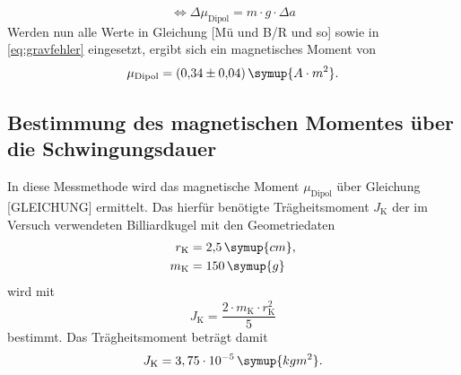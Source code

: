 \begin{equation}
\iff \Delta{\mu_{\text{Dipol}}} = m \cdot g \cdot \Delta a
\label{eq:gravfehler}
\end{equation}
Werden nun alle Werte in Gleichung [Mü und B/R und so] sowie in \eqref{eq:gravfehler} eingesetzt, ergibt sich ein magnetisches
Moment von
\begin{equation*}
\mu_{\text{Dipol}} = (0{,}34 \pm 0{,}04)\, \symup{A \cdot m^2}.
\end{equation*}



\subsection{Bestimmung des magnetischen Momentes über die Schwingungsdauer}
In diese Messmethode wird das magnetische Moment $\mu_{\text{Dipol}}$ über Gleichung [GLEICHUNG] ermittelt. 
Das hierfür benötigte Trägheitsmoment $J_{\text{K}}$ der im Versuch verwendeten Billiardkugel mit den Geometriedaten 
\begin{equation*}
\begin{aligned}
r_{\text{K}} &= 2{,}5\, \symup{cm}, \\
m_{\text{K}} &= 150\,\symup{g}
\end{aligned}
\end{equation*}
wird mit 
\begin{equation*}
J_{\text{K}} = \frac{2\cdot m_{\text{K}} \cdot r^2_{\text{K}}}{5}
\end{equation*}
bestimmt. Das Trägheitsmoment beträgt damit 
\begin{equation*}
J_{\text{K}} = 3,75 \cdot 10^{-5} \, \symup{kg m^2}.
\end{equation*}

